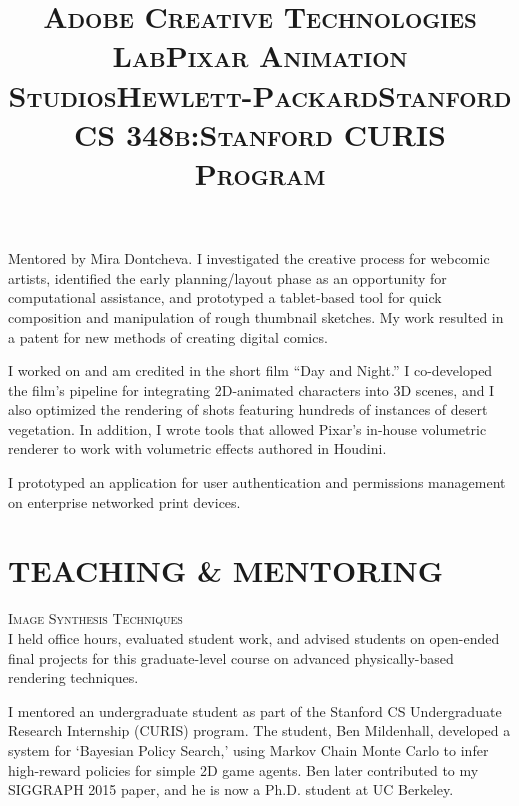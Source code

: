 \documentclass[line,margin]{res}
\begin{document}
\begin{resume}
\title{\textsc{Adobe Creative Technologies Lab}}
\begin{position}
Mentored by Mira Dontcheva. I investigated the creative process for webcomic artists, identified the early planning/layout phase as an opportunity for computational assistance, and prototyped a tablet-based tool for quick composition and manipulation of rough thumbnail sketches. My work resulted in a patent for new methods of creating digital comics.
\end{position}

\title{\textsc{Pixar Animation Studios}}
\begin{position}
I worked on and am credited in the short film ``Day and Night.'' I co-developed the film's pipeline for integrating 2D-animated characters into 3D scenes, and I also optimized the rendering of shots featuring hundreds of instances of desert vegetation. In addition, I wrote tools that allowed Pixar's in-house volumetric renderer to work with volumetric effects authored in Houdini.
\end{position}

\title{\textsc{Hewlett-Packard}}
\begin{position}
I prototyped an application for user authentication and permissions management on enterprise networked print devices.
\end{position}


\section{TEACHING \& MENTORING}


\title{\textsc{Stanford CS 348b:}}
\begin{position}
\textsc{Image Synthesis Techniques}\\
I held office hours, evaluated student work, and advised students on open-ended final projects for this graduate-level course on advanced physically-based rendering techniques.
\end{position}

\title{\textsc{Stanford CURIS Program}}
\begin{position}
I mentored an undergraduate student as part of the Stanford CS Undergraduate Research Internship (CURIS) program. The student, Ben Mildenhall, developed a system for `Bayesian Policy Search,' using Markov Chain Monte Carlo to infer high-reward policies for simple 2D game agents. Ben later contributed to my SIGGRAPH 2015 paper, and he is now a Ph.D. student at UC Berkeley.
\end{position}


\end{resume}
\end{document}
